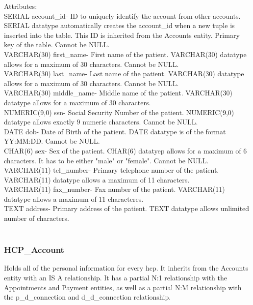 \documentclass[12pt]{report}
\begin{document}
Attributes:\\
SERIAL account\_id- ID to uniquely identify the account from other accounts. SERIAL datatype automatically creates the account\_id when a new tuple is inserted into the table.  This ID is inherited from the Accounts entity. Primary key of the table.  Cannot be NULL.\\

VARCHAR(30) first\_name-  First name of the patient.  VARCHAR(30) datatype allows for a maximum of 30 characters.  Cannot be NULL.\\

VARCHAR(30) last\_name- Last name of the patient.  VARCHAR(30) datatype allows for a maximum of 30 characters.  Cannot be NULL.\\ 

VARCHAR(30) middle\_name- Middle name of the patient. VARCHAR(30) datatype allows for a maximum of 30 characters.\\

NUMERIC(9,0) ssn- Social Security Number of the patient. NUMERIC(9,0) datatype allows exactly 9 numeric characters.  Cannot be NULL.\\

DATE dob- Date of Birth of the patient.  DATE datatype is of the format YY:MM:DD.  Cannot be NULL.\\

CHAR(6) sex- Sex of the patient. CHAR(6) datatyep allows for a maximum of 6 characters.  It has to be either "male" or "female".  Cannot be NULL.\\

VARCHAR(11) tel\_number- Primary telephone number of the patient.  VARCHAR(11) datatype allows a maximum of 11 characters.\\

VARCHAR(11) fax\_number- Fax number of the patient.  VARCHAR(11) datatype allows a maximum of 11 characteres.\\

TEXT address- Primary address of the patient.  TEXT datatype allows unlimited number of characters.\\ \\

\subsubsection{HCP\_Account}
Holds all of the personal information for every hcp.  It inherits from the Accounts entity with an IS A relationship.  It has a partial N:1 relationship with the Appointments and Payment entities, as well as a partial N:M relationship with the p\_d\_connection and d\_d\_connection relationship.\\ \\
\end{document}
